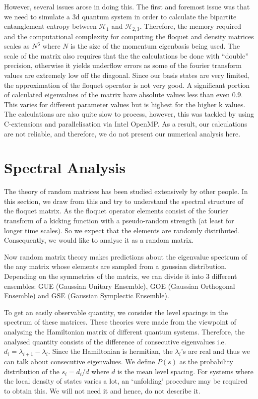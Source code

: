 \documentclass[twocolumn]{report}
\begin{document}
However, several issues arose in doing this. The first
and foremost issue was that we need to simulate a 3d quantum system in
order to calculate the bipartite entanglement entropy between
$\mathcal{H}_1$ and $\mathcal{H}_{2,3}$. Therefore, the memory required
and the computational complexity for computing the floquet and
density matrices scales as $N^6$ where $N$ is the size of the momentum
eigenbasis being used. The scale of the matrix also requires that the
the calculations be done with ``double'' precision, otherwise it yields
underflow errors as some of the fourier transform values are extremely
low off the diagonal. Since our basis states are very limited, the
approximation of the floquet operator is not very good. A significant
portion of calculated eigenvalues of the matrix have absolute values
less than even 0.9. This varies for different parameter values but is
highest for the higher k values. The calculations are also quite slow
to process, however, this was tackled by using C-extensions and parallelisation
via Intel OpenMP. As a result, our calculations are not
reliable, and therefore, we do not present our numerical analysis here.

\section{Spectral Analysis}
The theory of random matrices has been studied extensively by other people.
In this section, we draw from this and try to understand the spectral
structure of the floquet matrix. As the floquet operator elements consist
of the fourier transform of a kicking function with a pseudo-random strength
(at least for longer time scales). So we expect that the elements are randomly
distributed. Consequently, we would like to analyse it as a random matrix.

Now random matrix theory makes predictions about the eigenvalue spectrum
of the any matrix whose elements are sampled from a gaussian distribution.
Depending on the symmetries of the matrix, we can divide it into 3 different
ensembles: GUE (Gaussian Unitary Ensemble), GOE (Gaussian Orthogonal Ensemble)
and GSE (Gaussian Symplectic Ensemble).

To get an easily observable quantity, we consider the level spacings in the
spectrum of these matrices. These theories were made from the viewpoint of
analysing the Hamiltonian matrix of different quantum systems. Therefore,
the analysed quantity consists of the difference of consecutive eigenvalues
i.e. $d_i = \lambda_{i+1} - \lambda_{i}$. Since the Hamiltonian is hermitian, the
$\lambda_i$'s are real and thus we can talk about consecutive eigenvalues.
We define $P(s)$ as the probability distribution of the $s_i = d_i / \bar{d}$
where $\bar{d}$ is the mean level spacing. For systems where the local
density of states varies a lot, an `unfolding' procedure may be required to
obtain this. We will not need it and hence, do not describe it.
\end{document}
